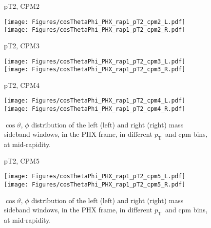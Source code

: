\documentclass[12pt]{article}
\newcommand{\pt}{$p_{\mathrm{T}}$}
\begin{document}
\begin{figure}[htbp]
\centering
\caption{pT2, CPM2}
\texttt{[image: Figures/cosThetaPhi\_PHX\_rap1\_pT2\_cpm2\_L.pdf]}
\texttt{[image: Figures/cosThetaPhi\_PHX\_rap1\_pT2\_cpm2\_R.pdf]}
\caption{pT2, CPM3}
\texttt{[image: Figures/cosThetaPhi\_PHX\_rap1\_pT2\_cpm3\_L.pdf]}
\texttt{[image: Figures/cosThetaPhi\_PHX\_rap1\_pT2\_cpm3\_R.pdf]}
\caption{pT2, CPM4}
\texttt{[image: Figures/cosThetaPhi\_PHX\_rap1\_pT2\_cpm4\_L.pdf]}
\texttt{[image: Figures/cosThetaPhi\_PHX\_rap1\_pT2\_cpm4\_R.pdf]}
\caption{$\cos\vartheta,\,\phi$ distribution of the left (left) and
  right (right) mass sideband windows, in the PHX frame, in different
  \pt\ and cpm bins, at mid-rapidity.}
\end{figure}
\clearpage

\begin{figure}[htbp]
\centering
\caption{pT2, CPM5}
\texttt{[image: Figures/cosThetaPhi\_PHX\_rap1\_pT2\_cpm5\_L.pdf]}
\texttt{[image: Figures/cosThetaPhi\_PHX\_rap1\_pT2\_cpm5\_R.pdf]}
\caption{$\cos\vartheta,\,\phi$ distribution of the left (left) and
  right (right) mass sideband windows, in the PHX frame, in different
  \pt\ and cpm bins, at mid-rapidity.}
\end{figure}
\clearpage
\end{document}
